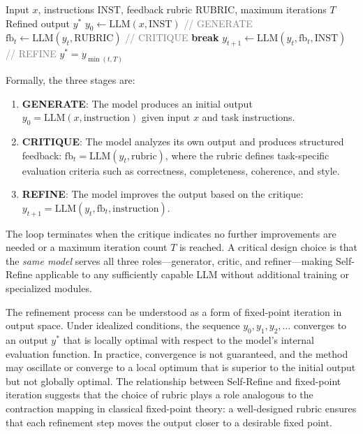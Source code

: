 \begin{algorithm}[t]
\caption{Self-Refine~\citep{madaan2023selfrefine}}
\label{alg:self-refine}
\begin{algorithmic}[1]
\REQUIRE Input $x$, instructions $\text{INST}$, feedback rubric $\text{RUBRIC}$, maximum iterations $T$
\ENSURE Refined output $y^{*}$
\STATE $y_0 \leftarrow \mathrm{LLM}(x, \text{INST})$ \hfill \textcolor{gray}{// GENERATE}
    \STATE $\mathrm{fb}_t \leftarrow \mathrm{LLM}(y_t, \text{RUBRIC})$ \hfill \textcolor{gray}{// CRITIQUE}
        \STATE \textbf{break}
    \ENDIF
    \STATE $y_{t+1} \leftarrow \mathrm{LLM}(y_t, \mathrm{fb}_t, \text{INST})$ \hfill \textcolor{gray}{// REFINE}
\ENDFOR
\RETURN $y^{*} = y_{\min(t, T)}$
\end{algorithmic}
\end{algorithm}

Formally, the three stages are:
\begin{enumerate}
    \item \textbf{GENERATE}: The model produces an initial output $y_0 = \mathrm{LLM}(x, \text{instruction})$ given input $x$ and task instructions.
    \item \textbf{CRITIQUE}: The model analyzes its own output and produces structured feedback: $\mathrm{fb}_t = \mathrm{LLM}(y_t, \text{rubric})$, where the rubric defines task-specific evaluation criteria such as correctness, completeness, coherence, and style.
    \item \textbf{REFINE}: The model improves the output based on the critique: $y_{t+1} = \mathrm{LLM}(y_t, \mathrm{fb}_t, \text{instruction})$.
\end{enumerate}

The loop terminates when the critique indicates no further improvements are needed or a maximum iteration count $T$ is reached. A critical design choice is that the \emph{same model} serves all three roles---generator, critic, and refiner---making Self-Refine applicable to any sufficiently capable LLM without additional training or specialized modules.

The refinement process can be understood as a form of fixed-point iteration in output space. Under idealized conditions, the sequence $y_0, y_1, y_2, \ldots$ converges to an output $y^{*}$ that is locally optimal with respect to the model's internal evaluation function. In practice, convergence is not guaranteed, and the method may oscillate or converge to a local optimum that is superior to the initial output but not globally optimal. The relationship between Self-Refine and fixed-point iteration suggests that the choice of rubric plays a role analogous to the contraction mapping in classical fixed-point theory: a well-designed rubric ensures that each refinement step moves the output closer to a desirable fixed point.

